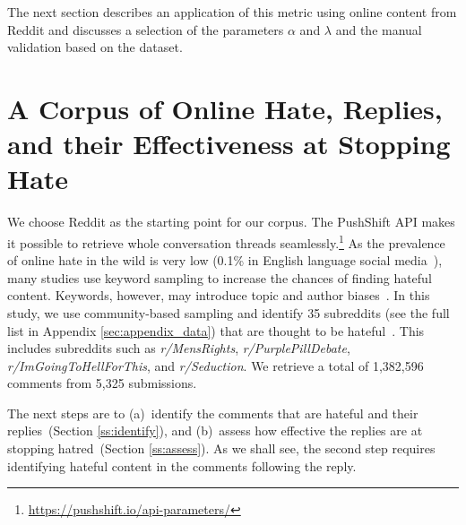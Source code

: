 \documentclass[11pt]{article}
\begin{document}
The next section describes an application of this metric using online content from Reddit
and discusses a selection of the parameters $\alpha$ and $\lambda$ and the manual validation based on the dataset. 


\section{A Corpus of Online Hate, Replies, and their Effectiveness at Stopping Hate}
\label{s:corpus}

We choose Reddit as the starting point for our corpus.
The PushShift API makes it possible to retrieve whole conversation threads seamlessly.\footnote{\url{https://pushshift.io/api-parameters/}}
As the prevalence of online hate in the wild is very low (0.1\% in English language social media~\cite{vidgen-etal-2019-challenges}), many studies use keyword sampling to increase the chances of finding hateful content. 
Keywords, however, may introduce topic and author biases~\cite{wiegand-etal-2019-detection,vidgen-etal-2021-introducing}. 
In this study, we use community-based sampling and identify
35 subreddits (see the full list in Appendix \ref{sec:appendix_data}) that are thought to be hateful~\cite{qian-etal-2019-benchmark,guest-etal-2021-expert,vidgen-etal-2021-introducing}. 
This includes subreddits such as \textit{r/MensRights},  \textit{r/PurplePillDebate}, \textit{r/ImGoingToHellForThis}, and \textit{r/Seduction}.
We retrieve a total of 1,382,596 comments from 5,325 submissions.

The next steps are to 
(a)~identify the comments that are hateful and their replies~(Section \ref{ss:identify}),
and
(b)~assess how effective the replies are at stopping hatred~(Section \ref{ss:assess}).
As we shall see, the second step requires identifying hateful content in the comments following the reply.
\end{document}
